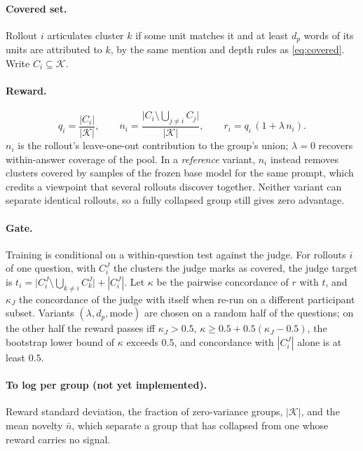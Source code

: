 \documentclass[11pt]{article}
\begin{document}
\paragraph{Covered set.} Rollout $i$ articulates cluster $k$ if some unit matches
it and at least $d_p$ words of its units are attributed to $k$, by the same
mention and depth rules as \eqref{eq:covered}. Write $C_i\subseteq\mathcal{K}$.

\paragraph{Reward.}
\begin{equation}\label{eq:group}
  q_i=\frac{|C_i|}{|\mathcal{K}|},\qquad
  n_i=\frac{\big|C_i\setminus\bigcup_{j\neq i}C_j\big|}{|\mathcal{K}|},\qquad
  r_i=q_i\,(1+\lambda\,n_i).
\end{equation}
$n_i$ is the rollout's leave-one-out contribution to the group's union; $\lambda=0$
recovers within-answer coverage of the pool. In a \emph{reference} variant, $n_i$
instead removes clusters covered by samples of the frozen base model for the same
prompt, which credits a viewpoint that several rollouts discover together.
Neither variant can separate identical rollouts, so a fully collapsed group still
gives zero advantage.

\paragraph{Gate.} Training is conditional on a within-question test against the
judge. For rollouts $i$ of one question, with $C^J_i$ the clusters the judge marks
as covered, the judge target is
$t_i=\big|C^J_i\setminus\bigcup_{k\neq i}C^J_k\big|+|C^J_i|$. Let $\kappa$ be the
pairwise concordance of $r$ with $t$, and $\kappa_J$ the concordance of the judge
with itself when re-run on a different participant subset. Variants
$(\lambda,d_p,\text{mode})$ are chosen on a random half of the questions; on the
other half the reward passes iff $\kappa_J>0.5$,
$\kappa\ge 0.5+0.5(\kappa_J-0.5)$, the bootstrap lower bound of $\kappa$ exceeds
$0.5$, and concordance with $|C^J_i|$ alone is at least $0.5$.

\paragraph{To log per group (not yet implemented).} Reward standard deviation, the
fraction of zero-variance groups, $|\mathcal{K}|$, and the mean novelty $\bar n$,
which separate a group that has collapsed from one whose reward carries no signal.
\end{document}
